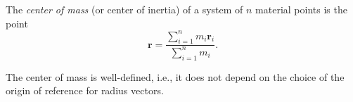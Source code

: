 The \textit{center of mass} (or center of inertia) of a system of $n$ material points is the point
$$\mathbf{r} = \frac{\sum_{i=1}^{n} m_i \mathbf{r}_i}{\sum_{i=1}^{n} m_i}.$$

The center of mass is well-defined, i.e., it does not depend on the choice of the origin of reference for radius vectors.
